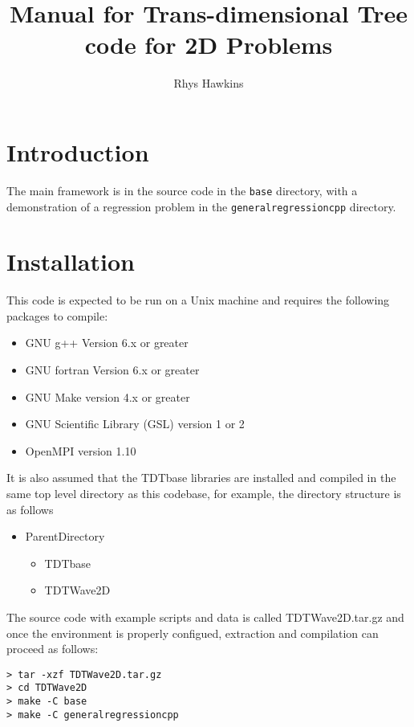 \documentclass{article}
\begin{document}
\title{Manual for Trans-dimensional Tree code for 2D Problems}
\author{Rhys Hawkins}

\maketitle

\section{Introduction}

The main framework is in the source code in the {\tt base} directory, with a
demonstration of a regression problem in the {\tt generalregressioncpp} directory.

\section{Installation}

This code is expected to be run on a Unix machine and requires the
following packages to compile:

\begin{itemize}
\item GNU g++ Version 6.x or greater
\item GNU fortran Version 6.x or greater
\item GNU Make version 4.x or greater
\item GNU Scientific Library (GSL) version 1 or 2
\item OpenMPI version 1.10
\end{itemize}

It is also assumed that the TDTbase libraries are installed and
compiled in the same top level directory as this codebase, for
example, the directory structure is as follows

\begin{itemize}
\item ParentDirectory
  \begin{itemize}
  \item TDTbase
  \item TDTWave2D
  \end{itemize}
\end{itemize}

The source code with example scripts and data is called
TDTWave2D.tar.gz and once the environment is properly
configued, extraction and compilation can proceed as follows:

\begin{verbatim}
> tar -xzf TDTWave2D.tar.gz
> cd TDTWave2D
> make -C base
> make -C generalregressioncpp
\end{verbatim}
\end{document}
